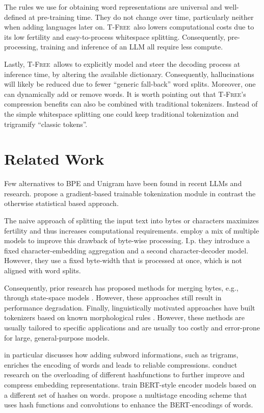 \documentclass[11pt]{article}
\newcommand{\method}{\textsc{T-Free}}
\begin{document}
The rules we use for obtaining word representations are universal and well-defined at pre-training time. They do not change over time, particularly neither when adding languages later on.
\method\ also lowers computational costs due to its low fertility and easy-to-process whitespace splitting. Consequently, pre-processing, training and inference of an LLM all require less compute. 

Lastly, \method\ allows to explicitly model and steer the decoding process at inference time, by altering the available dictionary. 
Consequently, hallucinations will likely be reduced due to fewer ``generic fall-back'' word splits. Moreover, one can dynamically add or remove words. 
It is worth pointing out that \method's compression benefits can also be combined with traditional tokenizers. Instead of the simple whitespace splitting one could keep traditional tokenization and trigramify ``classic tokens''. 

\section{Related Work}

Few alternatives to BPE and Unigram have been found in recent LLMs and research. 
\citet{charformer} propose a gradient-based trainable tokenization module in contrast the otherwise statistical based approach.

The naive approach of splitting the input text into bytes or characters maximizes fertility and thus increases computational requirements. 
\citet{megabyte} employ a mix of multiple models to improve this drawback of byte-wise processing. I.p. they introduce a fixed character-embedding aggregation and a second character-decoder model. However, they use a fixed byte-width that is processed at once, which is not aligned with word splits. 

Consequently, prior research has proposed methods for merging bytes, e.g., through state-space models \cite{wang2024mambabyte}.  However, these approaches still result in performance degradation. 
Finally, linguistically motivated approaches have built tokenizers based on known morphological rules \cite{jabbar2024morphpiece}. However, these methods are usually tailored to specific applications and are usually too costly and error-prone for large, general-purpose models.

\citet{fasttext} in particular discusses how adding subword informations, such as trigrams, enriches the encoding of words and leads to reliable compressions. \citet{hashembed} conduct research on the overloading of different hashfunctions to further improve and compress embedding representations. \citet{hashformer} train BERT-style encoder models based on a different set of hashes on words. \citet{canine} propose a multistage encoding scheme that uses hash functions and convolutions to enhance the BERT-encodings of words.
\end{document}
